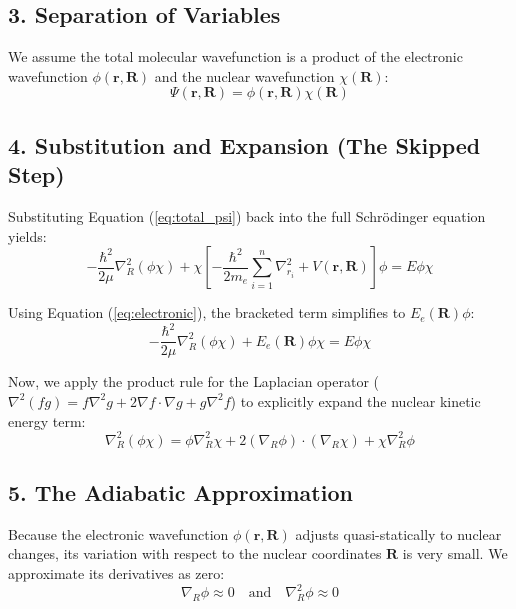 \documentclass{book}
\begin{document}
\subsection*{3. Separation of Variables}
We assume the total molecular wavefunction is a product of the electronic wavefunction $\phi(\mathbf{r}, \mathbf{R})$ and the nuclear wavefunction $\chi(\mathbf{R})$:
\begin{equation}
    \Psi(\mathbf{r}, \mathbf{R}) = \phi(\mathbf{r}, \mathbf{R}) \chi(\mathbf{R}) \label{eq:total_psi}
\end{equation}

\subsection*{4. Substitution and Expansion (The Skipped Step)}
Substituting Equation (\ref{eq:total_psi}) back into the full Schrödinger equation yields:
\begin{equation}
    -\frac{\hbar^2}{2\mu} \nabla_R^2 (\phi \chi) + \chi \left[ -\frac{\hbar^2}{2m_e} \sum_{i=1}^n \nabla_{r_i}^2 + V(\mathbf{r}, \mathbf{R}) \right] \phi = E \phi \chi
\end{equation}

Using Equation (\ref{eq:electronic}), the bracketed term simplifies to $E_e(\mathbf{R})\phi$:
\begin{equation}
    -\frac{\hbar^2}{2\mu} \nabla_R^2 (\phi \chi) + E_e(\mathbf{R}) \phi \chi = E \phi \chi \label{eq:subbed}
\end{equation}
% 

Now, we apply the product rule for the Laplacian operator ($\nabla^2(fg) = f\nabla^2g + 2\nabla f \cdot \nabla g + g\nabla^2f$) to explicitly expand the nuclear kinetic energy term:
\begin{equation}
    \nabla_R^2 (\phi \chi) = \phi \nabla_R^2 \chi + 2(\nabla_R \phi) \cdot (\nabla_R \chi) + \chi \nabla_R^2 \phi \label{eq:laplacian}
\end{equation}
% 

\subsection*{5. The Adiabatic Approximation}
Because the electronic wavefunction $\phi(\mathbf{r}, \mathbf{R})$ adjusts quasi-statically to nuclear changes, its variation with respect to the nuclear coordinates $\mathbf{R}$ is very small. We approximate its derivatives as zero:
\begin{equation}
    \nabla_R \phi \approx 0 \quad \text{and} \quad \nabla_R^2 \phi \approx 0
\end{equation}
\end{document}
